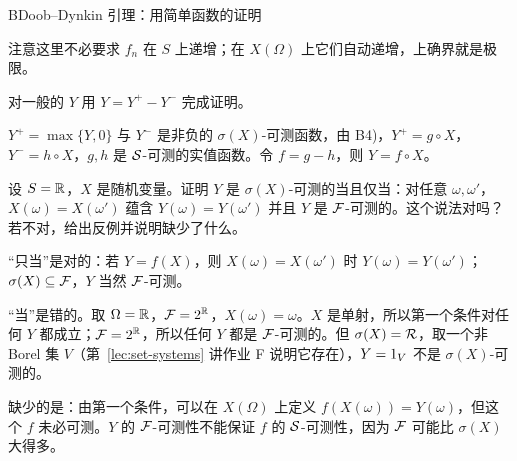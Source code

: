 \begin{probleme}{B}{Doob--Dynkin 引理：用简单函数的证明}
\begin{questions}
\begin{solution}
注意这里不必要求 $f_n$ 在 $S$ 上递增；在 $X(\Omega)$ 上它们自动递增，上确界就是极限。
\end{solution}
\item 对一般的 $Y$ 用 $Y=Y^+-Y^-$ 完成证明。
\begin{solution}
$Y^+=\max\{Y,0\}$ 与 $Y^-$ 是非负的 $\sigma(X)$-可测函数，由 B4)，$Y^+=g\circ X$，$Y^-=h\circ X$，$g,h$ 是 $\mathcal{S}$-可测的实值函数。令 $f=g-h$，则 $Y=f\circ X$。
\end{solution}
\item 设 $S=\mathbb{R}$，$X$ 是随机变量。证明 $Y$ 是 $\sigma(X)$-可测的当且仅当：对任意 $\omega,\omega'$，$X(\omega)=X(\omega')$ 蕴含 $Y(\omega)=Y(\omega')$ 并且 $Y$ 是 $\mathcal{F}$-可测的。这个说法对吗？若不对，给出反例并说明缺少了什么。
\begin{solution}
“只当”是对的：若 $Y=f(X)$，则 $X(\omega)=X(\omega')$ 时 $Y(\omega)=Y(\omega')$；$\sigma(X)\subseteq\mathcal{F}$，$Y$ 当然 $\mathcal{F}$-可测。

“当”是错的。取 $\Omega=\mathbb{R}$，$\mathcal{F}=2^{\mathbb{R}}$，$X(\omega)=\omega$。$X$ 是单射，所以第一个条件对任何 $Y$ 都成立；$\mathcal{F}=2^{\mathbb{R}}$，所以任何 $Y$ 都是 $\mathcal{F}$-可测的。但 $\sigma(X)=\mathcal{R}$，取一个非 Borel 集 $V$（第~\ref{lec:set-systems} 讲作业 F 说明它存在），$Y=1_V$ 不是 $\sigma(X)$-可测的。

缺少的是：由第一个条件，可以在 $X(\Omega)$ 上定义 $f(X(\omega))=Y(\omega)$，但这个 $f$ 未必可测。$Y$ 的 $\mathcal{F}$-可测性不能保证 $f$ 的 $\mathcal{S}$-可测性，因为 $\mathcal{F}$ 可能比 $\sigma(X)$ 大得多。
\end{solution}
\end{questions}
\end{probleme}

